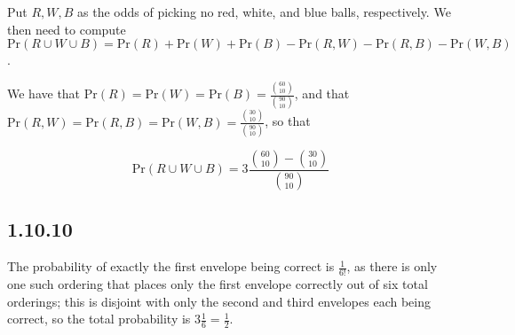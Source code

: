 \documentclass[12pt,letterpaper]{article}
\theoremstyle{definition}
\newcommand{\pr}[1]{\text{Pr}\left(#1\right)}
\begin{document}
Put $R, W, B$ as the odds of picking no red, white, and blue balls,
respectively. We then need to compute $\pr{R \cup W \cup B} = \pr{R} + \pr{W} +
\pr{B} - \pr{R, W} - \pr{R, B} - \pr{W, B}$.

We have that $\pr{R} = \pr{W} = \pr{B} = \frac{\binom{60}{10}}{\binom{90}{10}}$,
and that $\pr{R, W} = \pr{R, B} = \pr{W, B} =
\frac{\binom{30}{10}}{\binom{90}{10}}$, so that

\[
  \pr{R \cup W \cup B} = 3\frac{\binom{60}{10} - \binom{30}{10}}{\binom{90}{10}}
\]


\subsection*{1.10.10}

The probability of exactly the first envelope being correct is $\frac{1}{6!}$,
as there is only one such ordering that places only the first envelope correctly
out of six total orderings; this is disjoint with only the second and third
envelopes each being correct, so the total probability is $3\frac{1}{6} = \frac{1}{2}$.
\end{document}
